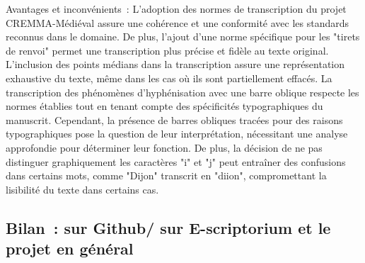 \documentclass[12pt,a4paper,oneside,titlepage]{article} %
\begin{document}
Avantages et inconvénients : L'adoption des normes de transcription du projet CREMMA-Médiéval assure une cohérence et une conformité avec les standards reconnus dans le domaine. De plus, l'ajout d'une norme spécifique pour les "tirets de renvoi" permet une transcription plus précise et fidèle au texte original. L'inclusion des points médians dans la transcription assure une représentation exhaustive du texte, même dans les cas où ils sont partiellement effacés. La transcription des phénomènes d'hyphénisation avec une barre oblique respecte les normes établies tout en tenant compte des spécificités typographiques du manuscrit. Cependant, la présence de barres obliques tracées pour des raisons typographiques pose la question de leur interprétation, nécessitant une analyse approfondie pour déterminer leur fonction. De plus, la décision de ne pas distinguer graphiquement les caractères "i" et "j" peut entraîner des confusions dans certains mots, comme "Dijon" transcrit en "diion", compromettant la lisibilité du texte dans certains cas.

\subsection{Bilan : sur Github/ sur E-scriptorium et le projet en général}
\end{document}
